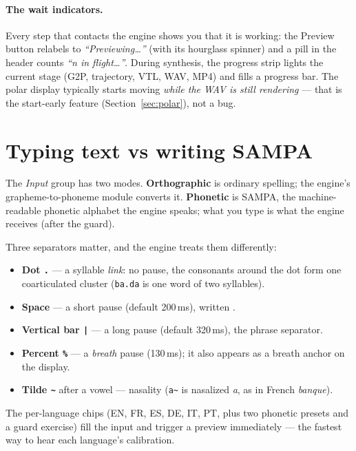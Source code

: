 \documentclass[11pt,a4paper]{article}
\newcommand{\ovs}{\textvisiblespace}       %
\begin{document}
\paragraph{The wait indicators.} Every step that contacts the engine
shows you that it is working: the Preview button relabels to
\emph{``Previewing\ldots''} (with its hourglass spinner) and a pill in
the header counts \emph{``n in flight\ldots''}. During synthesis, the progress strip
lights the current stage (G2P, trajectory, VTL, WAV, MP4) and fills a
progress bar. The polar display typically starts moving \emph{while the
WAV is still rendering} --- that is the start-early feature
(Section~\ref{sec:polar}), not a bug.

\section{Typing text vs writing SAMPA}

The \emph{Input} group has two modes. \textbf{Orthographic} is ordinary
spelling; the engine's grapheme-to-phoneme module converts it.
\textbf{Phonetic} is SAMPA, the machine-readable phonetic alphabet the
engine speaks; what you type is what the engine receives (after the guard).

Three separators matter, and the engine treats them differently:

\begin{itemize}
\item \textbf{Dot \texttt{.}} --- a syllable \emph{link}: no pause, the
  consonants around the dot form one coarticulated cluster
  (\texttt{ba.da} is one word of two syllables).
\item \textbf{Space} --- a short pause (default 200\,ms), written
  \texttt{\ovs}.
\item \textbf{Vertical bar \texttt{|}} --- a long pause (default 320\,ms),
  the phrase separator.
\item \textbf{Percent \texttt{\%}} --- a \emph{breath} pause
  (130\,ms); it also appears as a breath anchor on the display.
\item \textbf{Tilde \texttt{\~{}}} after a vowel --- nasality
  (\texttt{a\~{}} is nasalized \emph{a}, as in French \emph{banque}).
\end{itemize}

The per-language chips (EN, FR, ES, DE, IT, PT, plus two phonetic
presets and a guard exercise) fill the input and trigger a preview
immediately --- the fastest way to hear each language's calibration.
\end{document}
